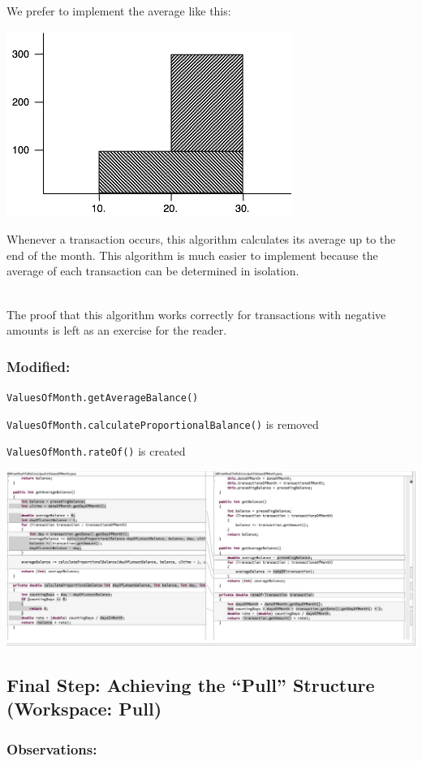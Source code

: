 \documentclass[a4paper,fleqn,titlepage,11pt]{article}
\begin{document}
We prefer to implement the average like this:

\includegraphics[width=.5\textwidth]{finalAverage.jpg}

Whenever a transaction occurs, this algorithm calculates its average up to the end of the month. This algorithm is much easier to implement because the average of each transaction can be determined in isolation.
\\~

The proof that this algorithm works correctly for transactions with negative amounts is left as an exercise for the reader.

\subsubsection*{Modified:}

\texttt{ValuesOfMonth.getAverageBalance()}

\texttt{ValuesOfMonth.calculateProportionalBalance()} is removed

\texttt{ValuesOfMonth.rateOf()} is created

\includegraphics[width=1\textwidth]{CompareViews/09-10.jpg}


\subsection*{Final Step: Achieving the ``Pull'' Structure (Workspace: Pull)}

\subsubsection*{Observations:}
\end{document}
